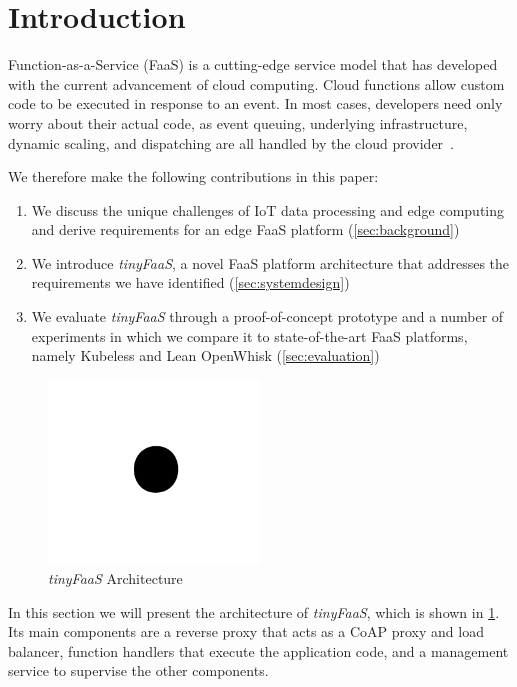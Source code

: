 \section{Introduction}
\label{sec:introduction}

Function-as-a-Service (FaaS) is a cutting-edge service model that has developed with the current advancement of cloud computing.
Cloud functions allow custom code to be executed in response to an event.
In most cases, developers need only worry about their actual code, as event queuing, underlying infrastructure, dynamic scaling, and dispatching are all handled by the cloud provider~\cite{book_bermbach2017_cloud_service_benchmarking}.

We therefore make the following contributions in this paper:

\begin{enumerate}
    \item We discuss the unique challenges of IoT data processing and edge computing and derive requirements for an edge FaaS platform (\cref{sec:background})
    \item We introduce \textit{tinyFaaS}, a novel FaaS platform architecture that addresses the requirements we have identified (\cref{sec:systemdesign})
    \item We evaluate \textit{tinyFaaS} through a proof-of-concept prototype and a number of experiments in which we compare it to state-of-the-art FaaS platforms, namely Kubeless and Lean OpenWhisk (\cref{sec:evaluation})
\end{enumerate}

\begin{figure}
    \centering
    \includegraphics[width=0.5\textwidth]{graphs/fig1.png}
    \caption{\textit{tinyFaaS} Architecture}
    \label{img:systemdesign}
\end{figure}

In this section we will present the architecture of \textit{tinyFaaS}, which is shown in \cref{img:systemdesign}.
Its main components are a reverse proxy that acts as a CoAP proxy and load balancer, function handlers that execute the application code, and a management service to supervise the other components.
